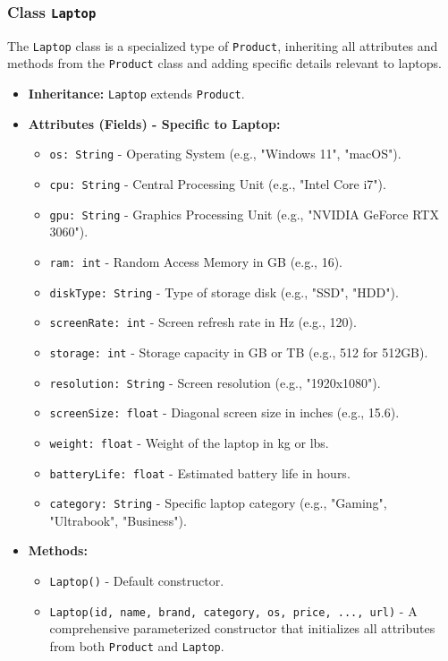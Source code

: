 \documentclass{article}
\begin{document}
\subsubsection{Class \texttt{Laptop}}
The \texttt{Laptop} class is a specialized type of \texttt{Product}, inheriting all attributes and methods from the \texttt{Product} class and adding specific details relevant to laptops.
\begin{itemize}
    \item \textbf{Inheritance:} \texttt{Laptop} extends \texttt{Product}.
    \item \textbf{Attributes (Fields) - Specific to Laptop:}
    \begin{itemize}
        \item \texttt{os: String} - Operating System (e.g., "Windows 11", "macOS").
        \item \texttt{cpu: String} - Central Processing Unit (e.g., "Intel Core i7").
        \item \texttt{gpu: String} - Graphics Processing Unit (e.g., "NVIDIA GeForce RTX 3060").
        \item \texttt{ram: int} - Random Access Memory in GB (e.g., 16).
        \item \texttt{diskType: String} - Type of storage disk (e.g., "SSD", "HDD").
        \item \texttt{screenRate: int} - Screen refresh rate in Hz (e.g., 120).
        \item \texttt{storage: int} - Storage capacity in GB or TB (e.g., 512 for 512GB).
        \item \texttt{resolution: String} - Screen resolution (e.g., "1920x1080").
        \item \texttt{screenSize: float} - Diagonal screen size in inches (e.g., 15.6).
        \item \texttt{weight: float} - Weight of the laptop in kg or lbs.
        \item \texttt{batteryLife: float} - Estimated battery life in hours.
        \item \texttt{category: String} - Specific laptop category (e.g., "Gaming", "Ultrabook", "Business").
    \end{itemize}
    \item \textbf{Methods:}
    \begin{itemize}
        \item \texttt{Laptop()} - Default constructor.
        \item \texttt{Laptop(id, name, brand, category, os, price, ..., url)} - A comprehensive parameterized constructor that initializes all attributes from both \texttt{Product} and \texttt{Laptop}.

\end{itemize}
\end{itemize}
\end{document}
